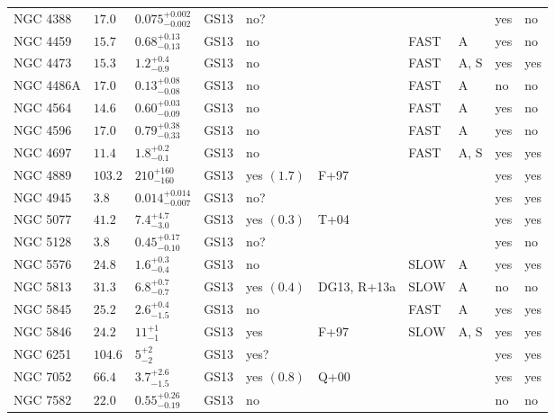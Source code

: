 \begin{table*}
\begin{center}
\begin{tabular}{llllllllll}
NGC 4388  &  $17.0$  &  $0.075_{-0.002}^{+0.002}$   &  GS13  &  no?  &     &      &     &  yes  &  no  \\ 
NGC 4459  &  $15.7$  &  $0.68_{-0.13}^{+0.13}$   &  GS13  &  no   &     &  FAST   &  A  &  yes  &  no  \\ 
NGC 4473  &  $15.3$  &  $1.2_{-0.9}^{+0.4}$   &  GS13  &  no   &     &  FAST   &  A, S  &  yes  &  yes  \\ 
NGC 4486A  &  $17.0$  &  $0.13_{-0.08}^{+0.08}$   &  GS13  &  no   &     &  FAST   &  A  &  no  &  no  \\ 
NGC 4564  &  $14.6$  &  $0.60_{-0.09}^{+0.03}$   &  GS13  &  no   &     &  FAST   &  A  &  yes  &  no  \\ 
NGC 4596  &  $17.0$  &  $0.79_{-0.33}^{+0.38}$   &  GS13  &  no   &     &  FAST   &  A  &  yes  &  no  \\ 
NGC 4697  &  $11.4$  &  $1.8_{-0.1}^{+0.2}$   &  GS13  &  no   &     &  FAST   &  A, S  &  yes  &  yes  \\ 
NGC 4889  &  $103.2$  &  $210_{-160}^{+160}$   &  GS13  &  yes  $(1.7)$  &  F+97  &      &     &  yes  &  yes  \\ 
NGC 4945  &  $3.8$  &  $0.014_{-0.007}^{+0.014}$   &  GS13  &  no?  &     &      &     &  yes  &  yes  \\ 
NGC 5077  &  $41.2$  &  $7.4_{-3.0}^{+4.7}$   &  GS13  &  yes  $(0.3)$  &  T+04  &      &     &  yes  &  yes  \\ 
NGC 5128  &  $3.8$  &  $0.45_{-0.10}^{+0.17}$   &  GS13  &  no?  &     &      &     &  yes  &  no  \\ 
NGC 5576  &  $24.8$  &  $1.6_{-0.4}^{+0.3}$   &  GS13  &  no   &     &   SLOW  &  A  &  yes  &  yes  \\ 
NGC 5813  &  $31.3$  &  $6.8_{-0.7}^{+0.7}$   &  GS13  &  yes  $(0.4)$  &  DG13, R+13a  &   SLOW  &  A  &  no  &  no  \\ 
NGC 5845  &  $25.2$  &  $2.6_{-1.5}^{+0.4}$   &  GS13  &  no   &     &  FAST   &  A  &  yes  &  yes  \\ 
NGC 5846  &  $24.2$  &  $11_{-1}^{+1}$   &  GS13  &  yes   &  F+97  &   SLOW  &  A, S  &  yes  &  yes  \\ 
NGC 6251  &  $104.6$  &  $5_{-2}^{+2}$   &  GS13  &  yes?  &     &      &     &  yes  &  yes  \\ 
NGC 7052  &  $66.4$  &  $3.7_{-1.5}^{+2.6}$   &  GS13  &  yes  $(0.8)$  &  Q+00  &      &     &  yes  &  yes  \\ 
NGC 7582  &  $22.0$  &  $0.55_{-0.19}^{+0.26}$   &  GS13  &  no   &     &      &     &  no  &  no  \\ 

\end{tabular}
\end{center}
\end{table*}
